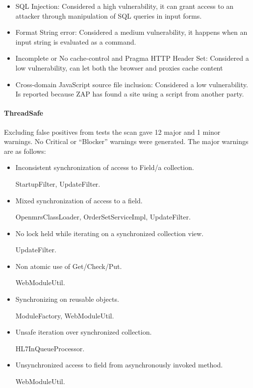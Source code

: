 \documentclass{report} %
\begin{document}
\begin{itemize}
  \item SQL Injection: Considered a high vulnerability, it can grant access to
    an attacker through manipulation of SQL queries in input forms.
  \item Format String error: Considered a medium vulnerability, it happens when
    an input string is evaluated as a command.
  \item Incomplete or No cache-control and Pragma HTTP Header Set: Considered a
    low vulnerability, can let both the browser and proxies cache content
  \item Cross-domain JavaScript source file inclusion: Considered a low
    vulnerability. Is reported because ZAP has found a site using a script from
    another party.
\end{itemize}

\paragraph{ThreadSafe} %

Excluding false positives from tests the scan gave 12 major and 1 minor
warnings. No Critical or ``Blocker'' warnings were generated. The major warnings
are as follows:

\begin{itemize}
\item Inconsistent synchronization of access to Field/a collection.

  StartupFilter, UpdateFilter.

\item Mixed synchronization of access to a field.

  OpenmrsClassLoader, OrderSetServiceImpl, UpdateFilter.
  
\item No lock held while iterating on a synchronized collection view.
  
  UpdateFilter.

\item Non atomic use of Get/Check/Put.

  WebModuleUtil.

\item Synchronizing on reusable objects.

  ModuleFactory, WebModuleUtil.

\item Unsafe iteration over synchronized collection.

  HL7InQueueProcessor.
  
\item Unsynchronized access to field from asynchronously invoked method.
  
  WebModuleUtil.

\end{itemize}
\end{document}
